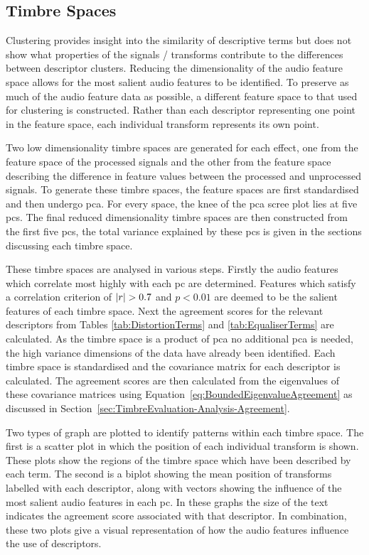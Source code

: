 	\subsection{Timbre Spaces}
	\label{sec:TimbreEvaluation-Analysis-TimbreSpaces}
		Clustering provides insight into the similarity of descriptive terms but does not show what properties of
		the signals / transforms contribute to the differences between descriptor clusters. Reducing the
		dimensionality of the audio feature space allows for the most salient audio features to be identified. To
		preserve as much of the audio feature data as possible, a different feature space to that used for
		clustering is constructed. Rather than each descriptor representing one point in the feature space, each
		individual transform represents its own point. 

		Two low dimensionality timbre spaces are generated for each effect, one from the feature space of the
		processed signals and the other from the feature space describing the difference in feature values between
		the processed and unprocessed signals. To generate these timbre spaces, the feature spaces are first
		standardised and then undergo \acrshort{pca}. For every space, the knee of the \acrshort{pca} scree plot
		lies at five \acrshort{pc}s. The final reduced dimensionality timbre spaces are then constructed from the
		first five \acrshort{pc}s, the total variance explained by these \acrshort{pc}s is given in the sections
		discussing each timbre space.

		These timbre spaces are analysed in various steps. Firstly the audio features which correlate most highly
		with each \acrshort{pc} are determined. Features which satisfy a correlation criterion of $\left|r\right| > 0.7$
		and $p < 0.01$ are deemed to be the salient features of each timbre space. Next the agreement scores for
		the relevant descriptors from Tables \ref{tab:DistortionTerms} and \ref{tab:EqualiserTerms} are calculated.
		As the timbre space is a product of \acrshort{pca} no additional \acrshort{pca} is needed, the high
		variance dimensions of the data have already been identified. Each timbre space is standardised and the
		covariance matrix for each descriptor is calculated. The agreement scores are then calculated from the
		eigenvalues of these covariance matrices using Equation~\ref{eq:BoundedEigenvalueAgreement} as discussed in
		Section~\ref{sec:TimbreEvaluation-Analysis-Agreement}.
		
		Two types of graph are plotted to identify patterns within each timbre space. The first is a scatter plot
		in which the position of each individual transform is shown. These plots show the regions of the timbre
		space which have been described by each term. The second is a biplot showing the mean position of
		transforms labelled with each descriptor, along with vectors showing the influence of the most salient
		audio features in each \acrshort{pc}. In these graphs the size of the text indicates the agreement score
		associated with that descriptor. In combination, these two plots give a visual representation of how the
		audio features influence the use of descriptors.

